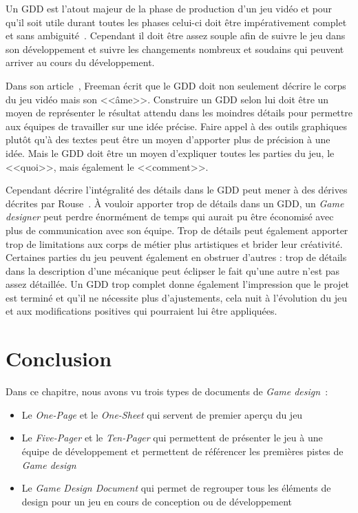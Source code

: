 Un GDD est l'atout majeur de la phase de production d'un jeu vidéo et pour qu'il soit utile durant toutes les phases celui-ci doit être impérativement complet et sans ambiguité~\cite{GD_Guidelines}.
Cependant il doit être assez souple afin de suivre le jeu dans son développement et suivre les changements nombreux et soudains qui peuvent arriver au cours du développement.

Dans son article~\cite{gama_greateGDD}, Freeman écrit que le GDD doit non seulement décrire le corps du jeu vidéo mais son <<âme>>.
Construire un GDD selon lui doit être un moyen de représenter le résultat attendu dans les moindres détails pour permettre aux équipes de travailler sur une idée précise.
Faire appel à des outils graphiques plutôt qu'à des textes peut être un moyen d'apporter plus de précision à une idée.
Mais le GDD doit être un moyen d'expliquer toutes les parties du jeu, le <<quoi>>, mais également le <<comment>>.

Cependant décrire l'intégralité des détails dans le GDD peut mener à des dérives décrites par Rouse~\cite{GD_theory_rouse}.
À vouloir apporter trop de détails dans un GDD, un \emph{Game designer} peut perdre énormément de temps qui aurait pu être économisé avec plus de communication avec son équipe.
Trop de détails peut également apporter trop de limitations aux corps de métier plus artistiques et brider leur créativité.
Certaines parties du jeu peuvent également en obstruer d'autres : trop de détails dans la description d'une mécanique peut éclipser le fait qu'une autre n'est pas assez détaillée.
Un GDD trop complet donne également l'impression que le projet est terminé et qu'il ne nécessite plus d'ajustements, cela nuit à l'évolution du jeu et aux modifications positives qui pourraient lui être appliquées.





\section{Conclusion}
Dans ce chapitre, nous avons vu trois types de documents de \emph{Game design}~: 
\begin{itemize}
    \item Le \emph{One-Page} et le \emph{One-Sheet} qui servent de premier aperçu du jeu
    \item Le \emph{Five-Pager} et le \emph{Ten-Pager} qui permettent de présenter le jeu à une équipe de développement et permettent de référencer les premières pistes de \emph{Game design}
    \item Le \emph{Game Design Document} qui permet de regrouper tous les éléments de design pour un jeu en cours de conception ou de développement
\end{itemize}



